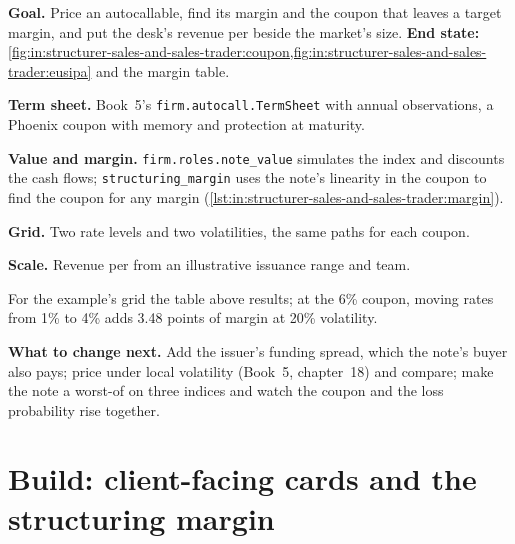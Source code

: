 \begin{tutorial}
\textbf{Goal.} Price an autocallable, find its margin and the coupon that leaves a target margin, and put the desk's
revenue per  beside the market's size.
\textbf{End state:} \cref{fig:in:structurer-sales-and-sales-trader:coupon,fig:in:structurer-sales-and-sales-trader:eusipa}
and the margin table.
\begin{tutsteps}
\item \textbf{Term sheet.} Book~5's \texttt{firm.autocall.TermSheet} with annual observations, a Phoenix coupon with
memory and protection at maturity.
\item \textbf{Value and margin.} \texttt{firm.roles.note\_value} simulates the index and discounts the cash flows;
\texttt{structuring\_margin} uses the note's linearity in the coupon to find the coupon for any margin
(\cref{lst:in:structurer-sales-and-sales-trader:margin}).
\label{lst:in:structurer-sales-and-sales-trader:margin}
\item \textbf{Grid.} Two rate levels and two volatilities, the same paths for each coupon.
\item \textbf{Scale.} Revenue per  from an illustrative issuance range and team.
\end{tutsteps}
\end{tutorial}

For the example's grid the table above results; at the 6\% coupon, moving rates from 1\% to 4\% adds 3.48 points of
margin at 20\% volatility.

\textbf{What to change next.} Add the issuer's funding spread, which the note's buyer also pays; price under local
volatility (Book~5, chapter~18) and compare; make the note a worst-of on three indices and watch the coupon and the loss
probability rise together.

\section{Build: client-facing cards and the structuring margin}\label{bld:in:structurer-sales-and-sales-trader:roles}

